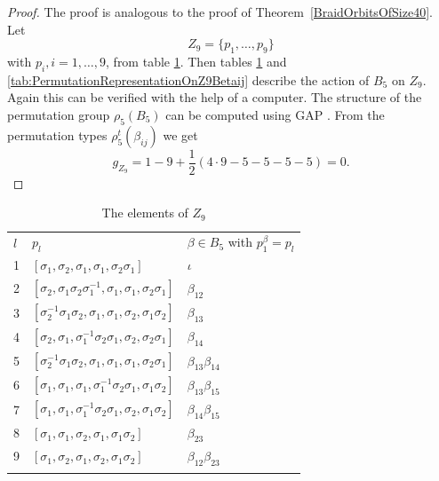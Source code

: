 \documentclass[12pt,a4paper]{article}
\numberwithin{equation}{section}
\numberwithin{table}{section}
\begin{document}
\begin{proof} The proof is analogous to the proof of Theorem~\ref{BraidOrbitsOfSize40}.
Let 
$$Z_9 = \{p_1, \dots, p_9\}$$
with $p_i, i=1, \dots, 9$, from table \ref{tab:ElementsZ9List}.
Then tables \ref{tab:ElementsZ9List} and \ref{tab:PermutationRepresentationOnZ9Betaij}
describe the action of $B_5$ on $Z_9$. Again this can be verified with the help of a computer.
The structure of the permutation group $\rho_5(B_5)$ can be computed using GAP \cite{RefGAP}.
From the permutation types $\rho^t_5(\beta_{ij})$ we get
$$g_{Z_9}= 1 - 9 + \frac{1}{2}(4\cdot 9 -5 -5 -5 -5) = 0.$$
\end{proof}
%
\begin{table}[!htbp]
\centering
\footnotesize
\captionsetup{font=footnotesize}
\caption{The elements of $Z_9$}
\label{tab:ElementsZ9List}
\begin{tabular}{lll}
\hline\noalign{\smallskip}
$l$        & $p_l$ & $\beta \in B_5$ with $p_1^{\beta} = p_l$ \\
\noalign{\smallskip}\hline\noalign{\smallskip}
1&$[\sigma_1,\sigma_2,\sigma_1,\sigma_1,\sigma_2\sigma_1]$&$\iota$\\
2&$[\sigma_2,\sigma_1\sigma_2\sigma_1^{-1},\sigma_1,\sigma_1,\sigma_2\sigma_1]$&$\beta_{12}$\\
3&$[\sigma_2^{-1}\sigma_1\sigma_2,\sigma_1,\sigma_1,\sigma_2,\sigma_1\sigma_2]$&$\beta_{13}$\\
4&$[\sigma_2,\sigma_1,\sigma_1^{-1}\sigma_2\sigma_1,\sigma_2,\sigma_2\sigma_1]$&$\beta_{14}$\\
5&$[\sigma_2^{-1}\sigma_1\sigma_2,\sigma_1,\sigma_1,\sigma_1,\sigma_2\sigma_1]$&$\beta_{13}\beta_{14}$\\
6&$[\sigma_1,\sigma_1,\sigma_1,\sigma_1^{-1}\sigma_2\sigma_1,\sigma_1\sigma_2]$&$\beta_{13}\beta_{15}$\\
7&$[\sigma_1,\sigma_1,\sigma_1^{-1}\sigma_2\sigma_1,\sigma_2,\sigma_1\sigma_2]$&$\beta_{14}\beta_{15}$\\
8&$[\sigma_1,\sigma_1,\sigma_2,\sigma_1,\sigma_1\sigma_2]$&$\beta_{23}$\\
9&$[\sigma_1,\sigma_2,\sigma_1,\sigma_2,\sigma_1\sigma_2]$&$\beta_{12}\beta_{23}$\\
\noalign{\smallskip}\hline
\end{tabular}
\end{table}
%
\end{document}
